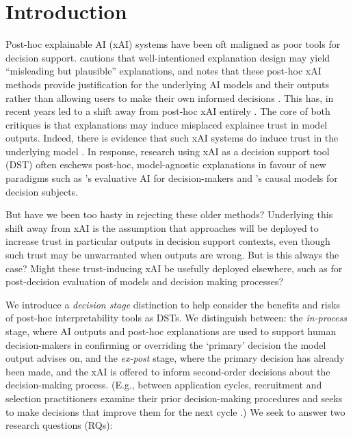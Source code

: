\minitoc

\section{Introduction}
Post-hoc explainable AI (xAI) systems have been oft maligned as poor tools for decision support. \textcite{Lipton} cautions that well-intentioned explanation design may yield ``misleading but plausible'' explanations, and \textcite{miller_explainable_2023} notes that these post-hoc xAI methods provide justification for the underlying AI models and their outputs rather than allowing users to make their own informed decisions \cite{miller_explainable_2023}. This has, in recent years led to a shift away from post-hoc xAI entirely \cite{Lipton,miller_explainable_2023,kumar_problems_2020,Bastounis_Campodonico_vanderSchaar_Adcock_Hansen_2024}. The core of both critiques is that explanations may induce misplaced explainee trust in model outputs. Indeed, there is evidence that such xAI systems do induce trust in the underlying model \cite{lai_human_2019,jacobs_how_2021}. In response, research using xAI as a decision support tool (DST) often eschews post-hoc, model-agnostic explanations in favour of new paradigms such as \textcite{miller_explainable_2023}'s evaluative AI for decision-makers and \textcite{karimi_algorithmic_2021}'s causal models for decision subjects.

But have we been too hasty in rejecting these older methods? Underlying this shift away from xAI is the assumption that approaches will be deployed to increase trust in particular outputs in decision support contexts, even though such trust may be unwarranted when outputs are wrong. But is this always the case? Might these trust-inducing xAI be usefully deployed elsewhere, such as for post-decision evaluation of models and decision making processes?

We introduce a \emph{decision stage} distinction to help consider the benefits and risks of post-hoc interpretability tools as DSTs. We distinguish between: the \emph{in-process} stage, where AI outputs and post-hoc explanations are used to support human decision-makers in confirming or overriding the `primary' decision the model output advises on, and the \emph{ex-post} stage, where the primary decision has already been made, and the xAI is offered to inform second-order decisions about the decision-making process. (E.g., between application cycles, recruitment and selection practitioners examine their prior decision-making procedures and seeks to make decisions that improve them for the next cycle \cite{li2020hiring}.) We seek to answer two research questions (RQs):

